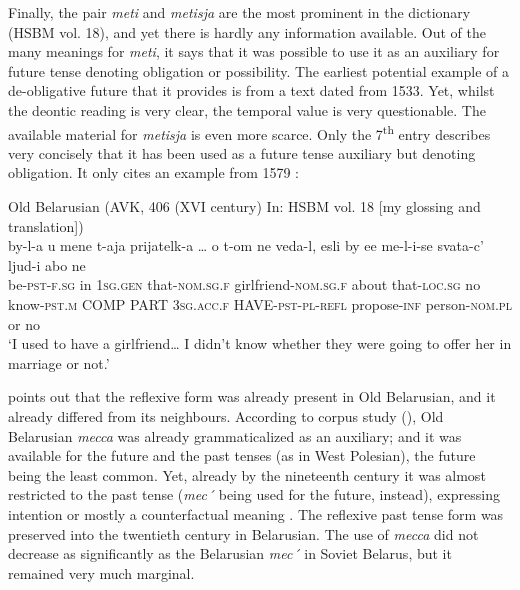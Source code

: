 \documentclass[output=paper,colorlinks,citecolor=brown]{langscibook}
\begin{document}
\largerpage[-3]

Finally, the pair \textit{meti} and \textit{metisja} are the most prominent in the dictionary (HSBM vol. 18), and yet there is hardly any information available. Out of the many meanings for \textit{meti}, it says that it was possible to use it as an auxiliary for future tense denoting obligation or possibility. The earliest potential example of a de-obligative future that it provides is from a text dated from 1533. Yet, whilst the deontic reading is very clear, the temporal value is very questionable. The available material for \textit{metisja} is even more scarce. Only the 7\textsuperscript{th} entry describes very concisely that it has been used as a future tense auxiliary but denoting obligation. It only cites an example from 1579 :

\ea \label{ex:roncero:19}
    Old Belarusian (AVK, 406 (XVI century) In: HSBM vol. 18 [my glossing and translation])\\
    \gll by-l-a u mene t-aja prijatelk-a … o t-om ne veda-l, esli by ee me-l-i-se svata-c’ ljud-i abo ne\\
    be-\textsc{pst-f.sg} in 1\textsc{sg.gen} that-\textsc{nom.sg.f} girlfriend-\textsc{nom.sg.f} {} about that-\textsc{loc.sg} no know-\textsc{pst.m} COMP PART 3\textsc{sg.acc.f} HAVE-\textsc{pst-pl-refl} propose-\textsc{inf} person-\textsc{nom.pl} or no\\
    \glt ‘I used to have a girlfriend… I didn’t know whether they were going to offer her in marriage or not.’
\z

\citet[186]{Mazzitelli2011} points out that the reflexive form was already present in Old Belarusian, and it already differed from its neighbours. According to  corpus study (\citeyear[192--193, 199]{Mazzitelli2011}), Old Belarusian \textit{mecca} was already grammaticalized as an auxiliary; and it was available for the future and the past tenses (as in West Polesian), the future being the least common. Yet, already by the nineteenth century it was almost restricted to the past tense (\textit{mec´} being used for the future, instead), expressing intention or mostly a counterfactual meaning \citep[192, 193, 199]{Mazzitelli2011}. The reflexive past tense form was preserved into the twentieth century in Belarusian. The use of \textit{mecca} did not decrease as significantly as the Belarusian \textit{mec´} in Soviet Belarus, but it remained very much marginal. 
\end{document}
